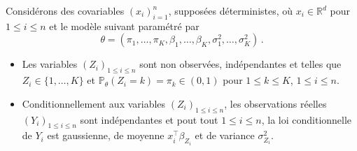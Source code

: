\documentclass[a4paper,10pt,fleqn]{article}
\newcommand{\eqsp}{\,}
\newcommand{\1}{\ensuremath{\mathbbm{1}}}
\begin{document}
Consid\'erons des covariables $(x_i)_{i=1}^n$, suppos\'ees d\'eterministes,  o\`u $x_i\in\mathbb{R}^d$ pour $1\leq i \leq n$ et le mod\`ele suivant param\'etr\'e par 
$$
\theta=(\pi_1,\dots,\pi_K,\beta_1,\dots,\beta_K,\sigma_1^2,\dots,\sigma_K^2)\eqsp.
$$
\begin{itemize}
\item Les variables $(Z_i)_{1\leq i \leq n}$ sont non observ\'ees, ind\'ependantes et telles que $Z_i\in\{1,\ldots,K\}$ et  $\mathbb{P}_\theta(Z_i= k) = \pi_k \in (0,1)$ pour $1\leq k \leq K$, $1\leq i \leq n$.
\item Conditionnellement aux variables  $(Z_i)_{1\leq i \leq n}$, les observations r\'eelles $(Y_i)_{1\leq i \leq n}$ sont ind\'ependantes et pout tout $1\leq i\leq n$, la loi conditionnelle de $Y_i$ est gaussienne, de moyenne $x_i^\top\beta_{Z_i}$ et de variance $\sigma_{Z_i}^2$.
\end{itemize}
\end{document}
